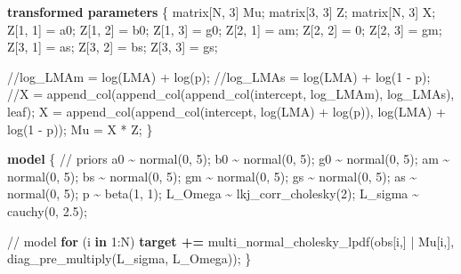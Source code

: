 \documentclass[
  12pt,
  letterpaper,
  DIV=11,
  numbers=noendperiod]{scrartcl}
\newenvironment{Shaded}{\begin{snugshade}}{\end{snugshade}}
\newcommand{\CommentTok}[1]{\textcolor[rgb]{0.37,0.37,0.37}{#1}}
\newcommand{\ControlFlowTok}[1]{\textcolor[rgb]{0.00,0.23,0.31}{\textbf{#1}}}
\newcommand{\DataTypeTok}[1]{\textcolor[rgb]{0.68,0.00,0.00}{#1}}
\newcommand{\DecValTok}[1]{\textcolor[rgb]{0.68,0.00,0.00}{#1}}
\newcommand{\FloatTok}[1]{\textcolor[rgb]{0.68,0.00,0.00}{#1}}
\newcommand{\KeywordTok}[1]{\textcolor[rgb]{0.00,0.23,0.31}{\textbf{#1}}}
\newcommand{\NormalTok}[1]{\textcolor[rgb]{0.00,0.23,0.31}{#1}}
\numberwithin{equation}{section}
\begin{document}
\begin{Shaded}
\begin{Highlighting}[]
\KeywordTok{transformed parameters}\NormalTok{ \{}
  \DataTypeTok{matrix}\NormalTok{[N, }\DecValTok{3}\NormalTok{] Mu;}
  \DataTypeTok{matrix}\NormalTok{[}\DecValTok{3}\NormalTok{, }\DecValTok{3}\NormalTok{] Z;}
  \DataTypeTok{matrix}\NormalTok{[N, }\DecValTok{3}\NormalTok{] X;}
\NormalTok{  Z[}\DecValTok{1}\NormalTok{, }\DecValTok{1}\NormalTok{] = a0;}
\NormalTok{  Z[}\DecValTok{1}\NormalTok{, }\DecValTok{2}\NormalTok{] = b0;}
\NormalTok{  Z[}\DecValTok{1}\NormalTok{, }\DecValTok{3}\NormalTok{] = g0;}
\NormalTok{  Z[}\DecValTok{2}\NormalTok{, }\DecValTok{1}\NormalTok{] = am;}
\NormalTok{  Z[}\DecValTok{2}\NormalTok{, }\DecValTok{2}\NormalTok{] = }\DecValTok{0}\NormalTok{;}
\NormalTok{  Z[}\DecValTok{2}\NormalTok{, }\DecValTok{3}\NormalTok{] = gm;}
\NormalTok{  Z[}\DecValTok{3}\NormalTok{, }\DecValTok{1}\NormalTok{] = as;}
\NormalTok{  Z[}\DecValTok{3}\NormalTok{, }\DecValTok{2}\NormalTok{] = bs;}
\NormalTok{  Z[}\DecValTok{3}\NormalTok{, }\DecValTok{3}\NormalTok{] = gs;}

  \CommentTok{//log\_LMAm = log(LMA) + log(p);}
  \CommentTok{//log\_LMAs = log(LMA) + log(1 {-} p);}
  \CommentTok{//X = append\_col(append\_col(append\_col(intercept, log\_LMAm), log\_LMAs), leaf);}
\NormalTok{  X = append\_col(append\_col(intercept, log(LMA) + log(p)), log(LMA) + log(}\DecValTok{1}\NormalTok{ {-} p));}
\NormalTok{  Mu = X * Z;}
\NormalTok{\}}

\KeywordTok{model}\NormalTok{ \{}
  \CommentTok{// priors}
\NormalTok{  a0 \textasciitilde{} normal(}\DecValTok{0}\NormalTok{, }\DecValTok{5}\NormalTok{);}
\NormalTok{  b0 \textasciitilde{} normal(}\DecValTok{0}\NormalTok{, }\DecValTok{5}\NormalTok{);}
\NormalTok{  g0 \textasciitilde{} normal(}\DecValTok{0}\NormalTok{, }\DecValTok{5}\NormalTok{);}
\NormalTok{  am \textasciitilde{} normal(}\DecValTok{0}\NormalTok{, }\DecValTok{5}\NormalTok{);}
\NormalTok{  bs \textasciitilde{} normal(}\DecValTok{0}\NormalTok{, }\DecValTok{5}\NormalTok{);}
\NormalTok{  gm \textasciitilde{} normal(}\DecValTok{0}\NormalTok{, }\DecValTok{5}\NormalTok{);}
\NormalTok{  gs \textasciitilde{} normal(}\DecValTok{0}\NormalTok{, }\DecValTok{5}\NormalTok{);}
\NormalTok{  as \textasciitilde{} normal(}\DecValTok{0}\NormalTok{, }\DecValTok{5}\NormalTok{);}
\NormalTok{  p \textasciitilde{} beta(}\DecValTok{1}\NormalTok{, }\DecValTok{1}\NormalTok{);}
\NormalTok{  L\_Omega \textasciitilde{} lkj\_corr\_cholesky(}\DecValTok{2}\NormalTok{);}
\NormalTok{  L\_sigma \textasciitilde{} cauchy(}\DecValTok{0}\NormalTok{, }\FloatTok{2.5}\NormalTok{);}

  \CommentTok{// model}
  \ControlFlowTok{for}\NormalTok{ (i }\ControlFlowTok{in} \DecValTok{1}\NormalTok{:N)}
     \KeywordTok{target +=}\NormalTok{ multi\_normal\_cholesky\_lpdf(obs[i,] | Mu[i,], diag\_pre\_multiply(L\_sigma, L\_Omega));}
\NormalTok{\}}


\end{Highlighting}
\end{Shaded}
\end{document}
